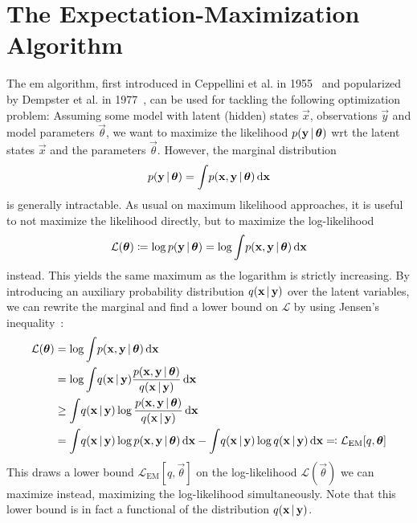 	\section{The Expectation-Maximization Algorithm}
		The \ac{em} algorithm, first introduced in Ceppellini et al. in 1955~\cite{ceppelliniEstimationGeneFrequencies1955} and popularized by Dempster et al. in 1977~\cite{dempsterMaximumLikelihoodIncomplete1977}, can be used for tackling the following optimization problem: Assuming some model with latent (hidden) states \(\vec{x}\), observations \(\vec{y}\) and model parameters \(\vec{\theta}\), we want to maximize the likelihood \( p(\boldsymbol{\mathrm{y}} \,\vert\, \boldsymbol{\mathrm{\theta}}) \) \ac{wrt} the latent states \(\vec{x}\) and the parameters \(\vec{\theta}\). However, the marginal distribution
		\begin{align*}
			p(\boldsymbol{\mathrm{y}} \,\vert\, \boldsymbol{\mathrm{\theta}}) = \int\! p(\boldsymbol{\mathrm{x}}, \boldsymbol{\mathrm{y}} \,\vert\, \boldsymbol{\mathrm{\theta}}) \dd{\boldsymbol{\mathrm{x}}}
		\end{align*}
		is generally intractable. As usual on maximum likelihood approaches, it is useful to not maximize the likelihood directly, but to maximize the log-likelihood
		\begin{align*}
			\mathcal{L}(\boldsymbol{\mathrm{\theta}}) \coloneqq \log p(\boldsymbol{\mathrm{y}} \,\vert\, \boldsymbol{\mathrm{\theta}}) = \log \int\! p(\boldsymbol{\mathrm{x}}, \boldsymbol{\mathrm{y}} \,\vert\, \boldsymbol{\mathrm{\theta}}) \dd{\boldsymbol{\mathrm{x}}}
		\end{align*}
		instead. This yields the same maximum as the logarithm is strictly increasing. By introducing an auxiliary probability distribution \( q(\boldsymbol{\mathrm{x}} \,\vert\, \boldsymbol{\mathrm{y}}) \) over the latent variables, we can rewrite the marginal and find a lower bound on \(\mathcal{L}\) by using Jensen's inequality~\cite{jensenFonctionsConvexesInegalites1906}:
		\begin{align}
			\mathcal{L}(\boldsymbol{\mathrm{\theta}})
				&= \log \int\! p(\boldsymbol{\mathrm{x}}, \boldsymbol{\mathrm{y}} \,\vert\, \boldsymbol{\mathrm{\theta}}) \dd{\boldsymbol{\mathrm{x}}}  \nonumber \\
				&= \log \int\! q(\boldsymbol{\mathrm{x}} \,\vert\, \boldsymbol{\mathrm{y}}) \frac{p(\boldsymbol{\mathrm{x}}, \boldsymbol{\mathrm{y}} \,\vert\, \boldsymbol{\mathrm{\theta}})}{q(\boldsymbol{\mathrm{x}} \,\vert\, \boldsymbol{\mathrm{y}})} \dd{\boldsymbol{\mathrm{x}}}  \nonumber \\
				&\geq \int\! q(\boldsymbol{\mathrm{x}} \,\vert\, \boldsymbol{\mathrm{y}}) \log \frac{p(\boldsymbol{\mathrm{x}}, \boldsymbol{\mathrm{y}} \,\vert\, \boldsymbol{\mathrm{\theta}})}{q(\boldsymbol{\mathrm{x}} \,\vert\, \boldsymbol{\mathrm{y}})} \dd{\boldsymbol{\mathrm{x}}}  \nonumber \\
				&= \int\! q(\boldsymbol{\mathrm{x}} \,\vert\, \boldsymbol{\mathrm{y}}) \log p(\boldsymbol{\mathrm{x}}, \boldsymbol{\mathrm{y}} \,\vert\, \boldsymbol{\mathrm{\theta}}) \dd{\boldsymbol{\mathrm{x}}} - \int\! q(\boldsymbol{\mathrm{x}} \,\vert\, \boldsymbol{\mathrm{y}}) \log q(\boldsymbol{\mathrm{x}} \,\vert\, \boldsymbol{\mathrm{y}}) \dd{\boldsymbol{\mathrm{x}}} \eqqcolon \mathcal{L}_\mathrm{EM}[q, \boldsymbol{\mathrm{\theta}}]  \label{eq:emLowerBound}
		\end{align}
		This draws a lower bound \( \mathcal{L}_\mathrm{EM}[q, \vec{\theta}] \) on the log-likelihood \( \mathcal{L}(\vec{\theta}) \) we can maximize instead, maximizing the log-likelihood simultaneously. Note that this lower bound is in fact a functional of the distribution \( q(\boldsymbol{\mathrm{x}} \,\vert\, \boldsymbol{\mathrm{y}}) \).

